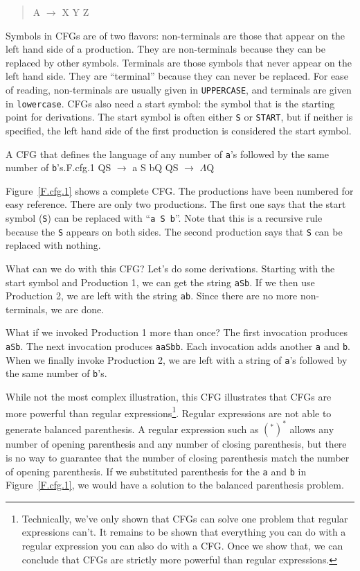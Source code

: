 \documentclass[letterpaper,12pt,openany,reqno]{book}%
\newcommand{\code}[1] {\lstinline[breaklines=yes,breakatwhitespace=yes]{#1}}
\newcommand{\cfgprod}[2] {{\ttfamily #1} $\rightarrow$ {\ttfamily #2}}
\newcommand{\cfgindentprod}[2] {\begin{quote} {\ttfamily #1} $\rightarrow$ {\ttfamily #2} \end{quote}}
\begin{document}
\cfgindentprod{A}{X Y Z}

Symbols in CFGs are of two flavors: non-terminals are those that appear on the left hand side of a production. They are non-terminals because they can be replaced by other symbols. Terminals are those symbols that never appear on the left hand side. They are ``terminal'' because they can never be replaced. For ease of reading, non-terminals are usually given in \texttt{UPPERCASE}, and terminals are given in \texttt{lowercase}. CFGs also need a start symbol: the symbol that is the starting point for derivations. The start symbol is often either \code{S} or \code{START}, but if neither is specified, the left hand side of the first production is considered the start symbol.

\begin{cfg}{A CFG that defines the language of any number of \code{a}'s followed by the same number of \code{b}'s.}{F.cfg.1}
Q\cfgprod{S}{a S b}Q
Q\cfgprod{S}{$\Lambda$}Q
\end{cfg}

Figure~\ref{F.cfg.1} shows a complete CFG. The productions have been numbered for easy reference. There are only two productions. The first one says that the start symbol (\code{S}) can be replaced with ``\code{a S b}''. Note that this is a recursive rule because the \code{S} appears on both sides. The second production says that \code{S} can be replaced with nothing.

What can we do with this CFG? Let's do some derivations. Starting with the start symbol and Production 1, we can get the string \code{aSb}. If we then use Production 2, we are left with the string \code{ab}. Since there are no more non-terminals, we are done.

What if we invoked Production 1 more than once? The first invocation produces \code{aSb}. The next invocation produces \code{aaSbb}. Each invocation adds another \code{a} and \code{b}. When we finally invoke Production 2, we are left with a string of \code{a}'s followed by the same number of \code{b}'s.

While not the most complex illustration, this CFG illustrates that CFGs are more powerful than regular expressions\footnote{Technically, we've only shown that CFGs can solve one problem that regular expressions can't. It remains to be shown that everything you can do with a regular expression you can also do with a CFG. Once we show that, we can conclude that CFGs are strictly more powerful than regular expressions.}. Regular expressions are not able to generate balanced parenthesis. A regular expression such as $(^*)^*$ allows any number of opening parenthesis and any number of closing parenthesis, but there is no way to guarantee that the number of closing parenthesis match the number of opening parenthesis. If we substituted parenthesis for the \code{a} and \code{b} in Figure~\ref{F.cfg.1}, we would have a solution to the balanced parenthesis problem.
\end{document}
